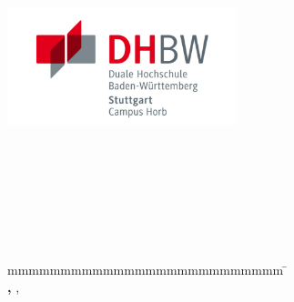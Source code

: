 
\begin{titlepage}
	\centering\includegraphics[width=0.5\textwidth]{images/dhbw.jpg}\\
	\enlargethispage{20mm}
	\begin{center}
		\vspace*{12mm}	{\LARGE\textbf \titel \par}
		\vspace*{12mm}	{\large\textbf \arbeit}\\
		\vspace*{12mm}	\langartikelstudiengang{} \langstudiengang{} \studiengang\\
    \vspace*{3mm}		\langanderdh{} \dhbw\\
		\vspace*{12mm}	\langvon\\
		\vspace*{3mm}		{\large\textbf \autor}\\
		\vspace*{12mm}	\datumAbgabe\\
	\end{center}
	\vfill
	\begin{spacing}{1.2}
	\begin{tabbing}
		mmmmmmmmmmmmmmmmmmmmmmmmmm             \= \kill
		\textbf{\langdbbearbeitungszeit}       \>  \zeitraum\\
		\textbf{\langdbmatriknr, \langdbkurs}  \>  \matrikelnr, \kurs\\
		\textbf{\langdbbetreuer}               \>  \betreuer\\
	\end{tabbing}
	\end{spacing}
\end{titlepage}
